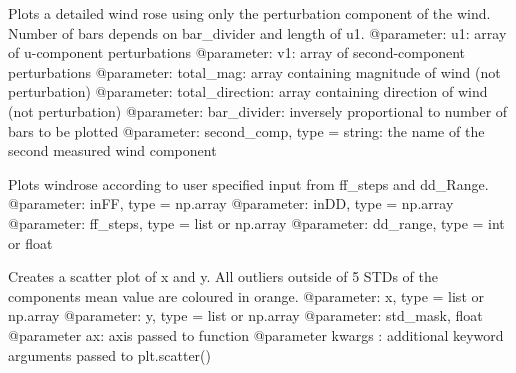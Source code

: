 \documentclass[letterpaper,10pt,english]{sphinxmanual}
\begin{document}

\begin{fulllineitems}
\label{\detokenize{index:windtunnel.plot_perturbation_rose}}
Plots a detailed wind rose using only the perturbation component of
the wind. Number of bars depends on bar\_divider and length of u1.
@parameter: u1: array of u-component perturbations
@parameter: v1: array of second-component perturbations
@parameter: total\_mag: array containing magnitude of wind (not perturbation)
@parameter: total\_direction: array containing direction of wind (not perturbation)
@parameter: bar\_divider: inversely proportional to number of bars to be plotted
@parameter: second\_comp, type = string: the name of the second measured wind component

\end{fulllineitems}


\begin{fulllineitems}
\label{\detokenize{index:windtunnel.plot_rose}}
Plots windrose according to user specified input from ff\_steps and
dd\_Range.
@parameter: inFF, type = np.array
@parameter: inDD, type = np.array
@parameter: ff\_steps, type = list or np.array
@parameter: dd\_range, type = int or float

\end{fulllineitems}


\begin{fulllineitems}
\label{\detokenize{index:windtunnel.plot_scatter}}
Creates a scatter plot of x and y. All outliers outside of 5 STDs of the
components mean value are coloured in orange.
@parameter: x, type = list or np.array
@parameter: y, type = list or np.array
@parameter: std\_mask, float
@parameter ax: axis passed to function
@parameter kwargs : additional keyword arguments passed to plt.scatter()

\end{fulllineitems}
\end{document}
